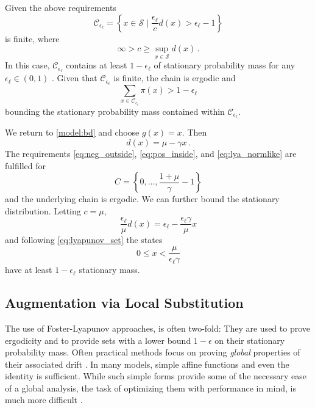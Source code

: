 Given the above requirements
\begin{equation}\label{eq:lyapunov_set}
    \mathcal{C}_{\epsilon_{\ell}} = \left\{ x\in\mathcal{S} \mid
    \frac{\epsilon_{\ell}}{c}d(x) > \epsilon_{\ell} - 1\right\}
\end{equation}
is finite, where
\[
    \infty> c\geq \sup_{x\in\mathcal{S}} d(x)\,.
\]
In this case, $\mathcal{C}_{\epsilon_{\ell}}$ contains at least $1-\epsilon_{\ell}$ of stationary probability mass for any $\epsilon_{\ell}\in(0,1)$ \parencite[][Thm.~8]{spieler2014numerical}.
Given that $\mathcal{C}_{\epsilon_{\ell}}$ is finite, the chain is ergodic and
\begin{equation}
    \sum_{x\in\mathcal{C}_{\epsilon_{\ell}}}\pi(x)> 1 - \epsilon_{\ell}
\end{equation}
bounding the stationary probability mass contained within $\mathcal{C}_{\epsilon_{\ell}}$.
\begin{example}
    We return to \autoref{model:bd} and choose $g(x) = x$.
    Then \[ d(x) = \mu - \gamma x\,. \]
    The requirements \eqref{eq:neg_outside}, \eqref{eq:pos_inside},
    and \eqref{eq:lya_normlike} are fulfilled for
    \[ C=\left\{0,\dotsc,\frac{1+\mu}{\gamma} - 1\right\} \]
    and the underlying chain is ergodic. We can further bound the stationary distribution.
    Letting $c=\mu$,
    \[ \frac{\epsilon_{\ell}}{\mu}d(x) = \epsilon_{\ell} - \frac{\epsilon_{\ell}\gamma}{\mu}x \]
    and following \eqref{eq:lyapunov_set} the states
    \[ 0\leq x<\frac{\mu}{\epsilon_{\ell}\gamma}  \]
    have at least $1-\epsilon_{\ell}$ stationary mass.
\end{example}


\subsection{Augmentation via Local Substitution}
The use of Foster-Lyapunov approaches, is often two-fold: They are used to prove ergodicity and to provide sets with a lower bound $1-\epsilon$ on their stationary probability mass.
Often practical methods focus on proving \emph{global} properties of their associated drift \parencite{gupta2014scalable,spieler2014numerical}.
In many models, simple affine functions \parencite{gupta2017finite} and even the identity \parencite{spieler2014numerical} is sufficient.
While such simple forms provide some of the necessary ease of a global analysis, the task of optimizing them with performance in mind, is much more difficult \parencite{milias2014optimization}.

